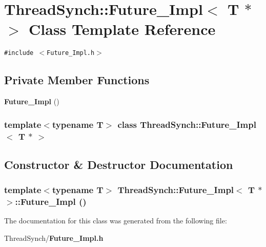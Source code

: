 \section{Thread\-Synch::Future\_\-Impl$<$ T $\ast$ $>$ Class Template Reference}
\label{class_thread_synch_1_1_future___impl_3_01_t_01_5_01_4}
{\tt \#include $<$Future\_\-Impl.h$>$}

\subsection*{Private Member Functions}
\begin{CompactItemize}
\item 
{\bf Future\_\-Impl} ()
\end{CompactItemize}
\subsubsection*{template$<$typename T$>$ class Thread\-Synch::Future\_\-Impl$<$ T $\ast$ $>$}



\subsection{Constructor \& Destructor Documentation}
\subsubsection{\setlength{\rightskip}{0pt plus 5cm}template$<$typename T$>$ {\bf Thread\-Synch::Future\_\-Impl}$<$ T $\ast$ $>$::{\bf Future\_\-Impl} ()\hspace{0.3cm}{\tt  [private]}}\label{class_thread_synch_1_1_future___impl_3_01_t_01_5_01_4_ef0333f616067385c42cc7ac5da1fc92}




The documentation for this class was generated from the following file:\begin{CompactItemize}
\item 
Thread\-Synch/{\bf Future\_\-Impl.h}\end{CompactItemize}
